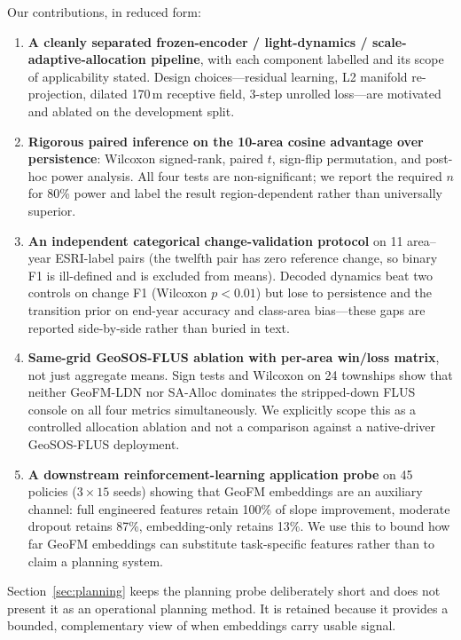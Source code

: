 \documentclass{article}
\begin{document}
Our contributions, in reduced form:

\begin{enumerate}
\item \textbf{A cleanly separated frozen-encoder / light-dynamics / scale-adaptive-allocation pipeline}, with each component labelled and its scope of applicability stated. Design choices---residual learning, L2 manifold re-projection, dilated 170\,m receptive field, 3-step unrolled loss---are motivated and ablated on the development split.

\item \textbf{Rigorous paired inference on the 10-area cosine advantage over persistence}: Wilcoxon signed-rank, paired $t$, sign-flip permutation, and post-hoc power analysis. All four tests are non-significant; we report the required $n$ for 80\% power and label the result region-dependent rather than universally superior.

\item \textbf{An independent categorical change-validation protocol} on 11 area--year ESRI-label pairs (the twelfth pair has zero reference change, so binary F1 is ill-defined and is excluded from means). Decoded dynamics beat two controls on change F1 (Wilcoxon $p<0.01$) but lose to persistence and the transition prior on end-year accuracy and class-area bias---these gaps are reported side-by-side rather than buried in text.

\item \textbf{Same-grid GeoSOS-FLUS ablation with per-area win/loss matrix}, not just aggregate means. Sign tests and Wilcoxon on 24 townships show that neither GeoFM-LDN nor SA-Alloc dominates the stripped-down FLUS console on all four metrics simultaneously. We explicitly scope this as a controlled allocation ablation and not a comparison against a native-driver GeoSOS-FLUS deployment.

\item \textbf{A downstream reinforcement-learning application probe} on 45 policies ($3\times 15$ seeds) showing that GeoFM embeddings are an auxiliary channel: full engineered features retain 100\% of slope improvement, moderate dropout retains 87\%, embedding-only retains 13\%. We use this to bound how far GeoFM embeddings can substitute task-specific features rather than to claim a planning system.
\end{enumerate}

Section~\ref{sec:planning} keeps the planning probe deliberately short and does not present it as an operational planning method. It is retained because it provides a bounded, complementary view of when embeddings carry usable signal.
\end{document}
